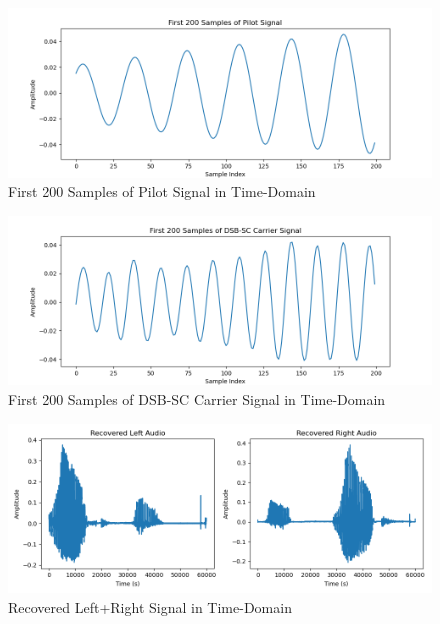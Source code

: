 \documentclass[
	letterpaper, %
	10pt, %
]{CSUniSchoolLabReport}
\begin{document}
\begin{figure}[H] %
	\centering %
	\includegraphics[width=1.2\textwidth]{assignment5a.png} %
	\caption{First 200 Samples of Pilot Signal in Time-Domain}
	\label{fig:block}
\end{figure}

\begin{figure}[H] %
	\centering %
	\includegraphics[width=1.2\textwidth]{assignment5b.png} %
	\caption{First 200 Samples of DSB-SC Carrier Signal in Time-Domain}
	\label{fig:block}
\end{figure}

\begin{figure}[H] %
	\centering %
	\includegraphics[width=1.2\textwidth]{assignment5c.png} %
	\caption{Recovered Left+Right Signal in Time-Domain}
	\label{fig:block}
\end{figure}
\end{document}
